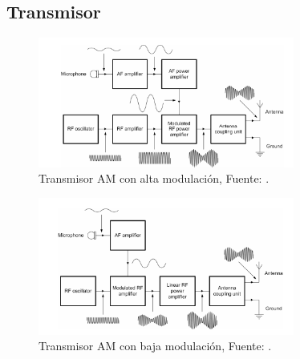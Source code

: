 











\subsection{Transmisor}
\label{sec:09.01.02.transmisor}


\begin{figure}[!htb]
  \centering
  \includegraphics[width=0.75\textwidth]{09.sintesis.comunicaciones.a.bordo/Imagenes.U09/transmisor_am_high-level_modulation.png}
  \caption{Transmisor AM con alta modulación, Fuente: \protect\cite{Tooley_Aircraft_communications_and_navigation_systems}.}
  \label{fig:AM_transmision}
\end{figure}

\begin{figure}[!htb]
  \centering
  \includegraphics[width=0.75\textwidth]{09.sintesis.comunicaciones.a.bordo/Imagenes.U09/transmisor_am_low-level_modulation.png}
  \caption{Transmisor AM con baja modulación, Fuente: \protect\cite{Tooley_Aircraft_communications_and_navigation_systems}.}
  \label{fig:AM_transmision_baja_modulacion}
\end{figure}


